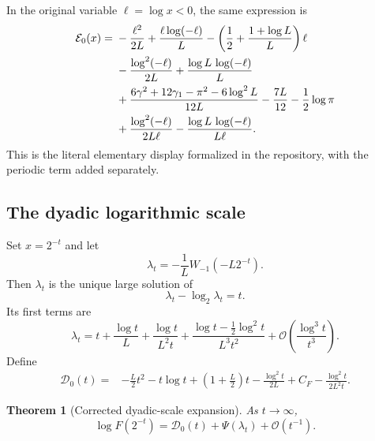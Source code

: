 \documentclass[11pt,oneside]{article}
\newtheorem{theorem}{Theorem}[section]
\theoremstyle{definition}
\theoremstyle{remark}
\newcommand{\bigO}{\mathcal O}
\begin{document}
In the original variable $\ell=\log x<0$, the same expression is
\begin{align}
 \mathcal E_0(x)
={}&-\frac{\ell^2}{2L}+\frac{\ell\log(-\ell)}L
 -\left(\frac12+\frac{1+\log L}{L}\right)\ell             \notag\\
 &-\frac{\log^2(-\ell)}{2L}
 +\frac{\log L\,\log(-\ell)}L                             \notag\\
 &+\frac{6\gamma^2+12\gamma_1-\pi^2-6\log^2L}{12L}
 -\frac{7L}{12}-\frac12\log\pi                           \notag\\
 &+\frac{\log^2(-\ell)}{2L\ell}
 -\frac{\log L\,\log(-\ell)}{L\ell}.                   \label{eq:elementary-main-ell}
\end{align}
This is the literal elementary display formalized in the repository, with the periodic term
added separately.

\subsection{The dyadic logarithmic scale}

Set $x=2^{-t}$ and let
\begin{equation}
 \lambda_t=-\frac1L W_{-1}(-L2^{-t}).                      \label{eq:lambda-t}
\end{equation}
Then $\lambda_t$ is the unique large solution of
\begin{equation}
 \lambda_t-\log_2\lambda_t=t.                             \label{eq:lambda-t-fixed}
\end{equation}
Its first terms are
\begin{equation}
 \lambda_t=t+\frac{\log t}{L}
 +\frac{\log t}{L^2t}
 +\frac{\log t-\tfrac12\log^2t}{L^3t^2}
 +\bigO\!\left(\frac{\log^3t}{t^3}\right).              \label{eq:lambda-t-expansion}
\end{equation}
Define
\begin{align}
 \mathcal D_0(t)
={}&-\frac L2t^2-t\log t+
 \left(1+\frac L2\right)t-\frac{\log^2t}{2L}+C_F
 -\frac{\log^2t}{2L^2t}.                                 \label{eq:dyadic-main}
\end{align}

\begin{theorem}[Corrected dyadic-scale expansion]
As $t\to\infty$,
\begin{equation}
 \boxed{
 \log F(2^{-t})=\mathcal D_0(t)+\Psi(\lambda_t)
 +\bigO(t^{-1}).}                                         \label{eq:dyadic-asymptotic}
\end{equation}
\end{theorem}
\end{document}

